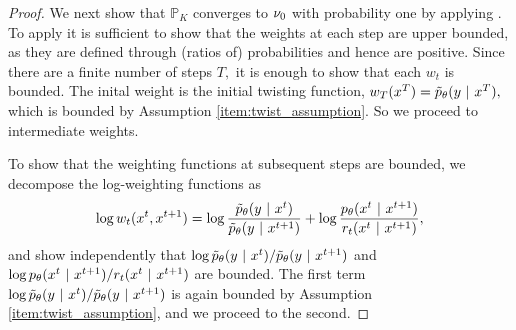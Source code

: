 \begin{proof}
We next show that $\mathbb{P}_K$ converges to $\nu_0$ with probability one by applying .
To apply  it is sufficient to show that the weights at each step are upper bounded, as they are defined through (ratios of) probabilities and hence are positive. 
Since there are a finite number of steps $T,$
it is enough to show that each $w_t$ is bounded.
The inital weight is the initial twisting function, $w_T(x^{T})=\tilde p_\theta(y~\vert~ x^{T}),$ which is bounded by Assumption \ref{item:twist_assumption}.
So we proceed to intermediate weights.

To show that the weighting functions at subsequent steps are bounded,
we decompose the log-weighting functions as 
$$
\log w_t(x^{t}, x^{t+1}) = \log \frac{\tilde p_\theta(y~\vert~ x^{t})}{\tilde p_\theta(y~\vert~ x^{t+1})} + \log \frac{p_{\theta}(x^{t}~\vert~ x^{t+1})}{r_t(x^{t} ~\vert~ x^{t+1})} ,
$$
and show independently that $\log \tilde p_\theta(y~\vert~ x^{t})/\tilde p_\theta(y~\vert~ x^{t+1})$ and
$\log p_{\theta}(x^{t}~\vert~ x^{t+1})/r_t(x^{t} ~\vert~ x^{t+1})$ are bounded.
The first term $\log \tilde p_\theta(y~\vert~ x^{t})/\tilde p_\theta(y~\vert~ x^{t+1})$ is again bounded by Assumption \ref{item:twist_assumption},
and we proceed to the second.


\end{proof}
